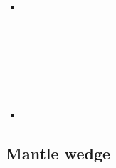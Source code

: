 \begin{scriptsize}
\begin{itemize}
\textcite{hohv20} \\
\textcite{lufs20} \\
\textcite{wali20} \\
\textcite{ruml20} \\
\item[\twothousandtwentyone] 
\textcite{pocv21} \\ 
\textcite{vepn21} \\
\textcite{adkc21} \\
\textcite{gath21} \\
\textcite{ligl21b} \\
\textcite{gubt21} \\
\textcite{josv21} \\
\item[\twothousandtwentytwo] 
\textcite{rikg22} \\
\end{itemize}
\end{scriptsize}


\subsection{Mantle wedge} 


